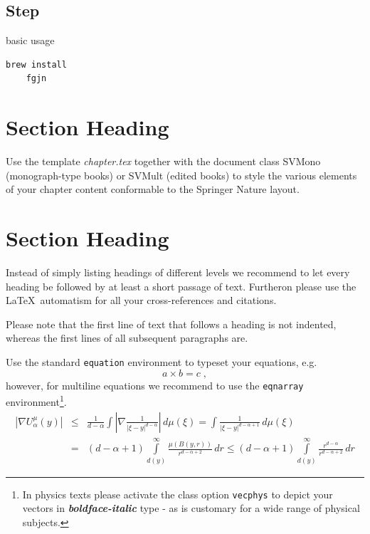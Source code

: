 \subsection*{\textbf{Step}}
\label{sec:37}












\label{sec:0}
\begin{programcode}{basic usage}
\begin{verbatim}
brew install
    fgjn
\end{verbatim}
\end{programcode}



\section{Section Heading}
\label{sec:1}
Use the template \emph{chapter.tex} together with the document class SVMono (monograph-type books) or SVMult (edited books) to style the various elements of your chapter content conformable to the Springer Nature layout.

\section{Section Heading}
\label{sec:2}
Instead of simply listing headings of different levels we recommend to let every heading be followed by at least a short passage of text. Furtheron please use the \LaTeX\ automatism for all your cross-references and citations.

Please note that the first line of text that follows a heading is not indented, whereas the first lines of all subsequent paragraphs are.

\eject

Use the standard \verb|equation| environment to typeset your equations, e.g.
%
\begin{equation}
a \times b = c\;,
\end{equation}
%
however, for multiline equations we recommend to use the \verb|eqnarray| environment\footnote{In physics texts please activate the class option \texttt{vecphys} to depict your vectors in \textbf{\itshape boldface-italic} type - as is customary for a wide range of physical subjects.}.
\begin{eqnarray}
\left|\nabla U_{\alpha}^{\mu}(y)\right| &\le&\frac1{d-\alpha}\int
\left|\nabla\frac1{|\xi-y|^{d-\alpha}}\right|\,d\mu(\xi) =
\int \frac1{|\xi-y|^{d-\alpha+1}} \,d\mu(\xi)\qquad  \\
&=&(d-\alpha+1) \int\limits_{d(y)}^\infty
\frac{\mu(B(y,r))}{r^{d-\alpha+2}}\,dr \le (d-\alpha+1)
\int\limits_{d(y)}^\infty \frac{r^{d-\alpha}}{r^{d-\alpha+2}}\,dr
\label{eq:10}
\end{eqnarray}

